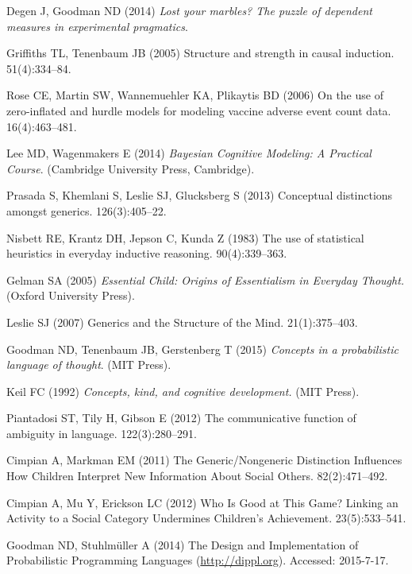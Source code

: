 \documentclass{pnastwo}
\begin{document}
\begin{article}
\begin{thebibliography}{10}
Degen J, Goodman ND (2014) {\em Lost your marbles? The puzzle of dependent
  measures in experimental pragmatics}.

Griffiths TL, Tenenbaum JB (2005) {Structure and strength in causal induction.}
 51(4):334--84.

Rose CE, Martin SW, Wannemuehler KA, Plikaytis BD (2006) On the use of
  zero-inflated and hurdle models for modeling vaccine adverse event count
  data.
 16(4):463--481.

Lee MD, Wagenmakers E (2014) {\em Bayesian Cognitive Modeling: A Practical
  Course}.
\newblock (Cambridge University Press, Cambridge).

Prasada S, Khemlani S, Leslie SJ, Glucksberg S (2013) {Conceptual distinctions
  amongst generics.}
 126(3):405--22.

Nisbett RE, Krantz DH, Jepson C, Kunda Z (1983) {The use of statistical
  heuristics in everyday inductive reasoning.}
 90(4):339--363.

Gelman SA (2005) {\em Essential Child: Origins of Essentialism in Everyday
  Thought.}
\newblock (Oxford University Press).

Leslie SJ (2007) {Generics and the Structure of the Mind}.
 21(1):375--403.

Goodman ND, Tenenbaum JB, Gerstenberg T (2015) {\em Concepts in a probabilistic
  language of thought}.
\newblock (MIT Press).

Keil FC (1992) {\em Concepts, kind, and cognitive development.}
\newblock (MIT Press).

Piantadosi ST, Tily H, Gibson E (2012) {The communicative function of ambiguity
  in language}.
 122(3):280--291.

Cimpian A, Markman EM (2011) {The Generic/Nongeneric Distinction Influences How
  Children Interpret New Information About Social Others}.
 82(2):471--492.

Cimpian A, Mu Y, Erickson LC (2012) {Who Is Good at This Game? Linking an
  Activity to a Social Category Undermines Children's Achievement}.
 23(5):533--541.

Goodman ND, Stuhlm\"{u}ller A (2014) {The Design and Implementation of
  Probabilistic Programming Languages} (\url{http://dippl.org}).
\newblock Accessed: 2015-7-17.

\end{thebibliography}

\end{article}
\end{document}
